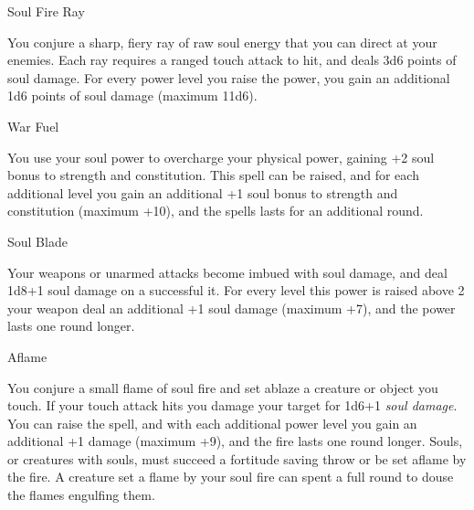 \begin{soulpower}{Soul Fire Ray}
  \rangeclose
  \instantaneous

  You conjure a sharp, fiery ray of raw soul energy that you can direct at
  your enemies. Each ray requires a ranged touch attack to hit, and deals 3d6
  points of soul damage. For every power level you raise the power, you gain
  an additional 1d6 points of soul damage (maximum 11d6).
\end{soulpower}

\begin{soulpower}{War Fuel}
  \rangepersonal

  You use your soul power to overcharge your physical power, gaining +2 soul
  bonus to strength and constitution. This spell can be raised, and for each
  additional level you gain an additional +1 soul bonus to strength and
  constitution (maximum +10), and the spells lasts for an additional round.
\end{soulpower}

\begin{soulpower}{Soul Blade}

  Your weapons or unarmed attacks become imbued with soul damage, and deal
  1d8+1 soul damage on a successful it. For every level this power is raised
  above 2 your weapon deal an additional +1 soul damage (maximum +7), and the
  power lasts one round longer.
\end{soulpower}

\begin{soulpower}{Aflame}

  You conjure a small flame of soul fire and set ablaze a creature or object
  you touch. If your touch attack hits you damage your target for 1d6+1
  \emph{soul damage}. You can raise the spell, and with each additional power
  level you gain an additional +1 damage (maximum +9), and the fire lasts one
  round longer.  Souls, or creatures with souls, must succeed a fortitude
  saving throw or be set aflame by the fire. A creature set a flame by your
  soul fire can spent a full round to douse the flames engulfing them.
\end{soulpower}

